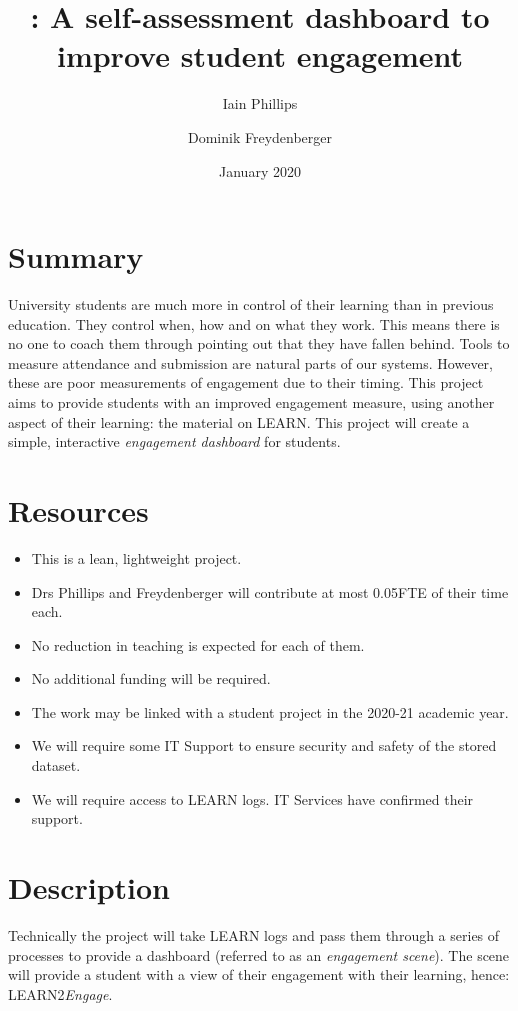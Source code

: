 \documentclass[11pt]{lucs-art}
\title{\ltoe: A self-assessment dashboard to improve student engagement}
\author{Iain Phillips\and Dominik Freydenberger}
\date{January 2020}
\newcommand{\ltoe}{LEARN{\kern 1pt}2\emph{Engage}\xspace}
\begin{document}
\maketitle
\section{Summary}

University students are much more in control of their learning than in
previous education.  They control when, how and on what they work.
This means there is no one to coach them through pointing out that
they have fallen behind.  Tools to measure attendance and submission
are natural parts of our systems.  However, these are poor
measurements of engagement due to their timing.  This project aims to
provide students with an improved engagement measure, using another
aspect of their learning: the material on LEARN\@.  This project will create  a simple, interactive \emph{engagement dashboard} for students.

\section{Resources}

\begin{itemize}
\item This is a lean, lightweight project.
\item Drs Phillips and Freydenberger will contribute at most 0.05FTE
  of their time each.
\item No reduction in teaching is expected for each of them.
\item No additional funding will be required.
\item The work may be linked with a student project in the 2020-21
  academic year.
\item We will require some IT Support to ensure security and safety of
  the stored dataset.
\item We will require access to LEARN logs.  IT Services have confirmed
  their support.
\end{itemize}

\section{Description}

Technically the project will take LEARN logs and pass them through a
series of processes to provide a dashboard (referred to as an
\emph{engagement scene}).  The scene will provide a student with a
view of their engagement with their learning, hence: \ltoe.
\end{document}
